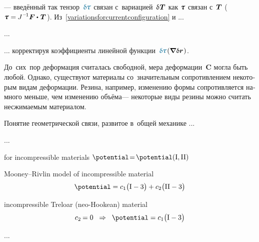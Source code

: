 \begin{otherlanguage}{russian}
\vspace{-0.2em} \noindent --- введённый так тензор~${\varbivalent{\hspace{-0.2ex}\cauchystress}}$ связан с~вариацией~$\variation{\hspace{.1ex}\firstpiolakirchhoffstress}$ как $\cauchystress$ связан с~$\bm{T}$ (${\cauchystress = \hspace{-0.1ex} J^{\hspace{.12ex}\expminusone} \bm{F} \dotp \hspace{.16ex} \firstpiolakirchhoffstress\hspace{.2ex}}$). Из~\eqref{variationsforcurrentconfiguration} и ...

...

... корректируя коэффициенты линейной функции~${\varbivalent{\hspace{-0.2ex}\cauchystress}\hspace{.15ex}(\boldnabla \hspace{.1ex} \variation{\currentlocationvector}\hspace{.1ex})}$.

\end{otherlanguage}



\label{para:internalconstraints}

\begin{otherlanguage}{russian}

До~сих~пор деформация считалась свободной, мера деформации~$\bm{C}$ могла быть любой. Однако, существуют материалы со~значительным сопротивлением некоторым видам деформации. Резина, например, изменению формы сопротивляется намного меньше, чем изменению объёма\:--- некоторые виды резины можно считать несжимаемым материалом.

Понятие геометрической связи, развитое в~общей механике ...

...

for incompressible materials ${\potential \hspace{-0.4ex} = \hspace{-0.33ex} \potential(\mathrm{I}, \mathrm{II})}$

Mooney\hbox{--}Rivlin model of incompressible material
\[
\potential = c_1 \bigl( \mathrm{I} - 3\bigr) + c_2 \bigl( \mathrm{II} - 3\bigr)
\]

incompressible Treloar (neo-Hookean) material
\[
c_2 \hspace{-0.16ex} = 0
\;\;\Rightarrow\;\;
\potential = c_1 \bigl( \mathrm{I} - 3\bigr)
\]

...


\end{otherlanguage}

